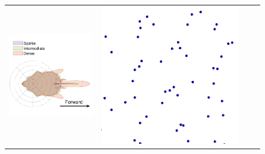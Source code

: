 \begin{figure}
    \centering
    \setlength{\resLen}{0.8in}
    \addtolength{\tabcolsep}{-3pt}
    \begin{tabular}{cccc}
        \includegraphics[width=\resLen]{images/pfunc/distance.png} &
        \includegraphics[width=\resLen]{images/particle/validate2_D1_N100_500nm.png} &

\end{tabular}
\end{figure}
